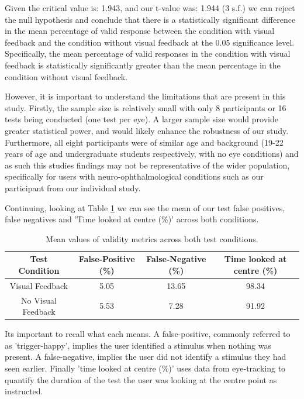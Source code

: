 \documentclass{l4proj}
\begin{document}
Given the critical value is: 1.943, and our t-value was: 1.944 (3 s.f.) we can reject the null hypothesis and conclude that there is a statistically significant difference in the mean percentage of valid response between the condition with visual feedback and the condition without visual feedback at the 0.05 significance level. Specifically, the mean percentage of valid responses in the condition with visual feedback is statistically significantly  greater than the mean percentage in the condition without visual feedback.

However, it is important to understand the limitations that are present in this study. Firstly, the sample size is relatively small with only 8 participants or 16 tests being conducted (one test per eye). A larger sample size would provide greater statistical power, and would likely enhance the robustness of our study. Furthermore, all eight participants were of similar age and background (19-22 years of age and undergraduate students respectively, with no eye conditions) and as such this studies findings may not be representative of the wider population, specifically for users with neuro-ophthalmological conditions such as our participant from our individual study.


Continuing, looking at Table \ref{table:mean_false_values} we can see the mean of our test false positives, false negatives and 'Time looked at centre (\%)'  across both conditions.
\begin{table}[h]
    \centering
    \caption{Mean values of validity metrics across both test conditions.}
    \label{table:mean_false_values}
    \begin{tabular}{|c|c|c|c|}
        \hline
        \textbf{Test Condition} & False-Positive (\%) & False-Negative (\%) & Time looked at centre (\%) \\
        \hline
        Visual Feedback & 5.05 & 13.65 & 98.34\\
        \hline
        No Visual Feedback & 5.53 & 7.28 & 91.92\\
        \hline
    \end{tabular}
\end{table}

Its important to recall what each means. A false-positive, commonly referred to as 'trigger-happy', implies the user identified a stimulus when nothing was present. A false-negative, implies the user did not identify a stimulus they had seen earlier. Finally 'time looked at centre (\%)' uses data from eye-tracking to quantify the duration of the test the user was looking at the centre point as instructed.  
\end{document}
